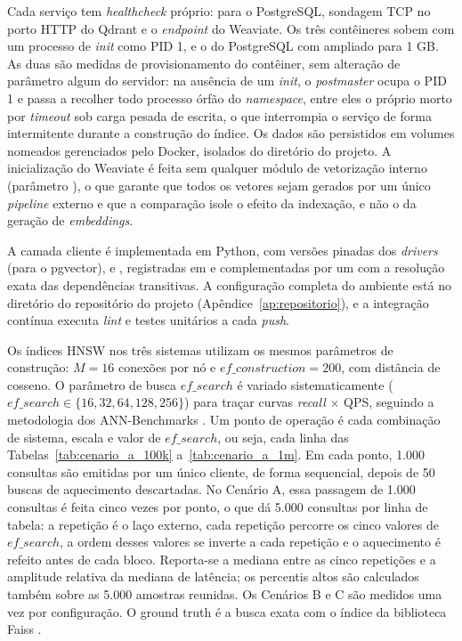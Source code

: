Cada serviço tem \textit{healthcheck} próprio:  para o PostgreSQL, sondagem TCP no porto HTTP do Qdrant e o \textit{endpoint}  do Weaviate. Os três contêineres sobem com um processo de \textit{init} como PID 1, e o do PostgreSQL com  ampliado para 1 GB. As duas são medidas de provisionamento do contêiner, sem alteração de parâmetro algum do servidor: na ausência de um \textit{init}, o \textit{postmaster} ocupa o PID 1 e passa a recolher todo processo órfão do \textit{namespace}, entre eles o próprio  morto por \textit{timeout} sob carga pesada de escrita, o que interrompia o serviço de forma intermitente durante a construção do índice. Os dados são persistidos em volumes nomeados gerenciados pelo Docker, isolados do diretório do projeto. A inicialização do Weaviate é feita sem qualquer módulo de vetorização interno (parâmetro ), o que garante que todos os vetores sejam gerados por um único \textit{pipeline} externo e que a comparação isole o efeito da indexação, e não o da geração de \textit{embeddings}.

A camada cliente é implementada em Python, com versões pinadas dos \textit{drivers}  (para o pgvector),  e , registradas em  e complementadas por um  com a resolução exata das dependências transitivas. A configuração completa do ambiente está no diretório  do repositório do projeto (Apêndice~\ref{ap:repositorio}), e a integração contínua executa \textit{lint} e testes unitários a cada \textit{push}.

Os índices HNSW nos três sistemas utilizam os mesmos parâmetros de construção: $M = 16$ conexões por nó e $ef\_construction = 200$, com distância de cosseno. O parâmetro de busca $ef\_search$ é variado sistematicamente ($ef\_search \in \{16, 32, 64, 128, 256\}$) para traçar curvas \textit{recall} $\times$ QPS, seguindo a metodologia dos ANN-Benchmarks \cite{aumuller2020annbench}. Um ponto de operação é cada combinação de sistema, escala e valor de $ef\_search$, ou seja, cada linha das Tabelas~\ref{tab:cenario_a_100k} a~\ref{tab:cenario_a_1m}. Em cada ponto, 1.000 consultas são emitidas por um único cliente, de forma sequencial, depois de 50 buscas de aquecimento descartadas. No Cenário A, essa passagem de 1.000 consultas é feita cinco vezes por ponto, o que dá 5.000 consultas por linha de tabela: a repetição é o laço externo, cada repetição percorre os cinco valores de $ef\_search$, a ordem desses valores se inverte a cada repetição e o aquecimento é refeito antes de cada bloco. Reporta-se a mediana entre as cinco repetições e a amplitude relativa da mediana de latência; os percentis altos são calculados também sobre as 5.000 amostras reunidas. Os Cenários B e C são medidos uma vez por configuração. O ground truth é a busca exata com o índice  da biblioteca Faiss \cite{douze2026faiss}.

